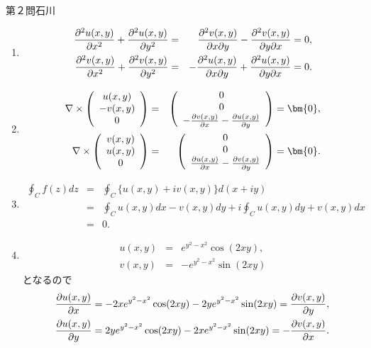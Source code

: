 \begin{answer}{第２問}{石川}
\begin{enumerate}
\item
  \begin{eqnarray}
    \frac{\partial ^2u(x,y)}{\partial x^2}+\frac{\partial ^2u(x,y)}{\partial y^2} &=& \frac{\partial ^2v(x,y)}{\partial x\partial y} - \frac{\partial ^2v(x,y)}{\partial y\partial x}
      = 0,\\
    \frac{\partial ^2v(x,y)}{\partial x^2}+\frac{\partial ^2v(x,y)}{\partial y^2} &=& -\frac{\partial ^2u(x,y)}{\partial x\partial y} + \frac{\partial ^2u(x,y)}{\partial y\partial x}
      = 0.
  \end{eqnarray}

\item
  \begin{eqnarray}
    \nabla \times \left(
      \begin{array}{c}
        u(x,y) \\
        -v(x,y)\\
        0
      \end{array}
    \right)
      &=&
      \left(
        \begin{array}{c}
          0\\
          0\\
          -\pdif{v(x,y)}{x} -\pdif{u(x,y)}{y}
        \end{array}
      \right) = \bm{0},\\
  \nabla \times \left(
    \begin{array}{c}
      v(x,y) \\
      u(x,y)\\
      0
    \end{array}
  \right)
    &=&
    \left(
      \begin{array}{c}
        0\\
        0\\
        \pdif{u(x,y)}{x} -\pdif{v(x,y)}{y}
      \end{array}
    \right) = \bm{0}.
  \end{eqnarray}

\item
  \begin{eqnarray}
    \oint _{C}f(z)dz &=& \oint_{C}\{u(x,y)+iv(x,y)\}d(x+iy)\\
      &=& \oint_{C}u(x,y)dx-v(x,y)dy + i\oint_{C}u(x,y)dy+v(x,y)dx\\
      &=& 0.
  \end{eqnarray}

\item
  \begin{eqnarray}
    u(x,y) &=& e^{y^2-x^2}\cos(2xy),\\
    v(x,y) &=& -e^{y^2-x^2}\sin(2xy)
  \end{eqnarray}
  となるので\\
  \begin{eqnarray}
  \frac{\partial u(x,y)}{\partial x} = -2xe^{y^2-x^2}\cos(2xy)-2ye^{y^2-x^2}\sin(2xy) = \frac{\partial v(x,y)}{\partial y},\\
  \frac{\partial u(x,y)}{\partial y} = 2ye^{y^2-x^2}\cos(2xy)-2xe^{y^2-x^2}\sin(2xy) = -\frac{\partial v(x,y)}{\partial x}.
  \end{eqnarray}


\end{enumerate}
\end{answer}
